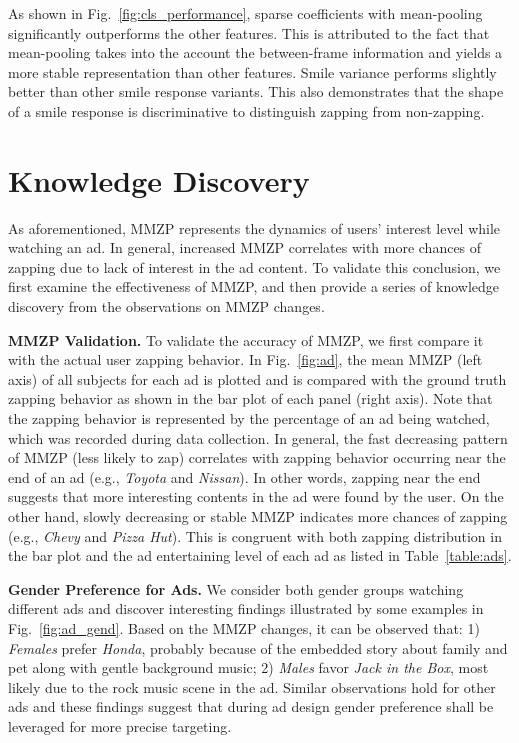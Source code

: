 \documentclass[twoside,leqno,twocolumn]{article}
\begin{document}
As shown in Fig.~\ref{fig:cls_performance}, sparse coefficients with mean-pooling significantly outperforms the other features. This is attributed to the fact that mean-pooling takes into the account the between-frame information and yields a more stable representation than other features. Smile variance performs slightly better than other smile response variants. This also demonstrates that the shape of a smile response is discriminative to distinguish zapping from non-zapping. 



\section{Knowledge Discovery}

As aforementioned, MMZP represents the dynamics of users' interest level while watching an ad. In general, increased MMZP correlates with more chances of zapping due to lack of interest in the ad content. To validate this conclusion, we first examine the effectiveness of MMZP, and then provide a series of knowledge discovery from the observations on MMZP changes. 

\noindent \textbf{MMZP Validation.} To validate the accuracy of MMZP, we first compare it with the actual user zapping behavior. In Fig.~\ref{fig:ad}, the mean MMZP (left axis) of all subjects for each ad is plotted and is compared with the ground truth zapping behavior as shown in the bar plot of each panel (right axis). Note that the zapping behavior is represented by the percentage of an ad being watched, which was recorded during data collection. In general, the fast decreasing pattern of MMZP (less likely to zap) correlates with zapping behavior occurring near the end of an ad (e.g., \textit{Toyota} and \textit{Nissan}). In other words, zapping near the end suggests that more interesting contents in the ad were found by the user. On the other hand, slowly decreasing or stable MMZP indicates more chances of zapping (e.g., \textit{Chevy} and \textit{Pizza Hut}). This is congruent with both zapping distribution in the bar plot and the ad entertaining level of each ad as listed in Table~\ref{table:ads}. 

\noindent \textbf{Gender Preference for Ads.} We consider both gender groups watching different ads and discover interesting findings illustrated by some examples in Fig.~\ref{fig:ad_gend}. Based on the MMZP changes, it can be observed that: 1) \textit{Females} prefer \textit{Honda}, probably because of the embedded story about family and pet along with gentle background music; 2) \textit{Males} favor \textit{Jack in the Box}, most likely due to the rock music scene in the ad. Similar observations hold for other ads and these findings suggest that during ad design gender preference shall be leveraged for more precise targeting. 
\end{document}
